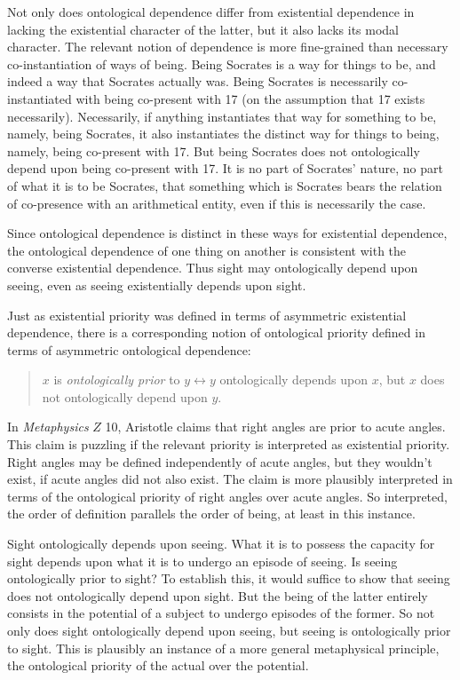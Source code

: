 \documentclass[12pt]{article}
\begin{document}
Not only does ontological dependence differ from existential dependence in lacking the existential character of the latter, but it also lacks its modal character. The relevant notion of dependence is more fine-grained than necessary co-instantiation of ways of being. Being Socrates is a way for things to be, and indeed a way that Socrates actually was. Being Socrates is necessarily co-instantiated with being co-present with 17 (on the assumption that 17 exists necessarily). Necessarily, if anything instantiates that way for something to be, namely, being Socrates, it also instantiates the distinct way for things to being, namely, being co-present with 17. But being Socrates does not ontologically depend upon being co-present with 17. It is no part of Socrates' nature, no part of what it is to be Socrates, that something which is Socrates bears the relation of co-presence with an arithmetical entity, even if this is necessarily the case.

Since ontological dependence is distinct in these ways for existential dependence, the ontological dependence of one thing on another is consistent with the converse existential dependence. Thus sight may ontologically depend upon seeing, even as seeing existentially depends upon sight.

Just as existential priority was defined in terms of asymmetric existential dependence, there is a corresponding notion of ontological priority defined in terms of asymmetric ontological dependence:
\begin{quote}
	\( x \) is \emph{ontologically prior} to \( y  \leftrightarrow  y \) ontologically depends upon \( x \), but \( x \) does not ontologically depend upon \( y \).
\end{quote}
In \emph{Metaphysics} \( Z \) 10, Aristotle claims that right angles are prior to acute angles. This claim is puzzling if the relevant priority is interpreted as existential priority. Right angles may be defined independently of acute angles, but they wouldn't exist, if acute angles did not also exist. The claim is more plausibly interpreted in terms of the ontological priority of right angles over acute angles. So interpreted, the order of definition parallels the order of being, at least in this instance.

Sight ontologically depends upon seeing. What it is to possess the capacity for sight depends upon what it is to undergo an episode of seeing. Is seeing ontologically prior to sight? To establish this, it would suffice to show that seeing does not ontologically depend upon sight. But the being of the latter entirely consists in the potential of a subject to undergo episodes of the former. So not only does sight ontologically depend upon seeing, but seeing is ontologically prior to sight. This is plausibly an instance of a more general metaphysical principle, the ontological priority of the actual over the potential.
\end{document}
